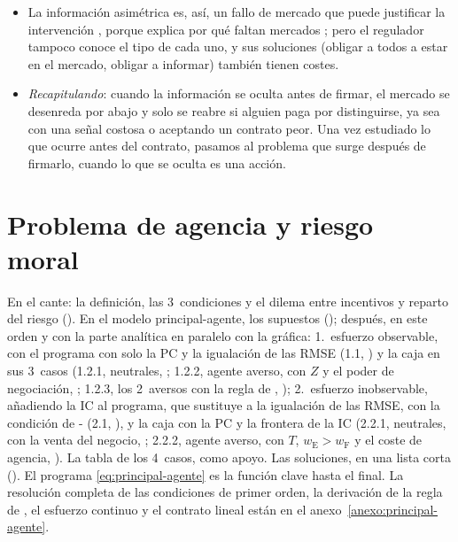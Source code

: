 \documentclass[11pt]{article}
\begin{document}
\begin{itemize}
\begin{itemize}
  \end{itemize}
\item La información asimétrica es, así, un fallo de mercado que puede justificar la intervención , porque explica por qué faltan mercados\nocite{Arrow1963Uncertainty} ; pero el regulador tampoco conoce el tipo de cada uno, y sus soluciones (obligar a todos a estar en el mercado, obligar a informar) también tienen costes.
\item \emph{Recapitulando}: cuando la información se oculta antes de firmar, el mercado se desenreda por abajo y solo se reabre si alguien paga por distinguirse, ya sea con una señal costosa o aceptando un contrato peor. Una vez estudiado lo que ocurre antes del contrato, pasamos al problema que surge después de firmarlo, cuando lo que se oculta es una acción.
\end{itemize}


\section{Problema de agencia y riesgo moral}\label{sec:agencia-riesgo-moral}

\begin{notaopositor}
En el cante: la definición, las 3~condiciones y el dilema entre incentivos y reparto del riesgo (). En el modelo principal-agente, los supuestos (); después, en este orden y con la parte analítica en paralelo con la gráfica: 1.~esfuerzo observable, con el programa con solo la PC y la igualación de las RMSE (1.1, ) y la caja en sus 3~casos (1.2.1, neutrales, ; 1.2.2, agente averso, con $Z$ y el poder de negociación, ; 1.2.3, los 2~aversos con la regla de , ); 2.~esfuerzo inobservable, añadiendo la IC al programa, que sustituye a la igualación de las RMSE, con la condición de - (2.1, ), y la caja con la PC y la frontera de la IC (2.2.1, neutrales, con la venta del negocio, ; 2.2.2, agente averso, con $T$, $w_{\mathrm{E}}>w_{\mathrm{F}}$ y el coste de agencia, ). La tabla de los 4~casos, como apoyo. Las soluciones, en una lista corta (). El programa \eqref{eq:principal-agente} es la función clave hasta el final. La resolución completa de las condiciones de primer orden, la derivación de la regla de , el esfuerzo continuo y el contrato lineal están en el anexo~\ref{anexo:principal-agente}.
\end{notaopositor}
\end{document}
